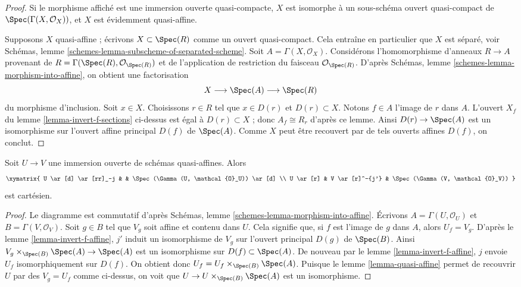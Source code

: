 \begin{proof}
Si le morphisme affiché est une immersion ouverte quasi-compacte,
$X$ est isomorphe à un sous-schéma ouvert quasi-compact de
$\Spec(\Gamma(X, \mathcal{O}_X))$, et $X$ est évidemment quasi-affine.

\medskip\noindent
Supposons $X$ quasi-affine ; écrivons $X \subset \Spec(R)$ comme un
ouvert quasi-compact. Cela entraîne en particulier que $X$ est
séparé, voir
Schémas, lemme \ref{schemes-lemma-subscheme-of-separated-scheme}.
Soit $A = \Gamma(X, \mathcal{O}_X)$.
Considérons l'homomorphisme d'anneaux $R \to A$ provenant de
$R = \Gamma(\Spec(R), \mathcal{O}_{\Spec(R)})$
et de l'application de restriction du faisceau $\mathcal{O}_{\Spec(R)}$.
D'après Schémas, lemme \ref{schemes-lemma-morphism-into-affine},
on obtient une factorisation
$$
X \longrightarrow
\Spec(A) \longrightarrow
\Spec(R)
$$
du morphisme d'inclusion. Soit $x \in X$. Choisissons $r \in R$ tel que
$x \in D(r)$ et $D(r) \subset X$. Notons $f \in A$ l'image de $r$
dans $A$. L'ouvert $X_f$ du lemme \ref{lemma-invert-f-sections}
ci-dessus est égal à $D(r) \subset X$ ; donc $A_f \cong R_r$ d'après
ce lemme.
Ainsi $D(r) \to \Spec(A)$ est un isomorphisme sur
l'ouvert affine principal $D(f)$ de $\Spec(A)$. Comme $X$
peut être recouvert par de tels ouverts affines $D(f)$, on conclut.
\end{proof}

\begin{lemma}
\label{lemma-cartesian-diagram-quasi-affine}
Soit $U \to V$ une immersion ouverte de schémas quasi-affines. Alors
$$
\xymatrix{
U \ar[d] \ar[rr]_-j & & \Spec(\Gamma(U, \mathcal{O}_U)) \ar[d] \\
U \ar[r] & V \ar[r]^-{j'} & \Spec(\Gamma(V, \mathcal{O}_V))
}
$$
est cartésien.
\end{lemma}

\begin{proof}
Le diagramme est commutatif d'après Schémas, lemme
\ref{schemes-lemma-morphism-into-affine}.
Écrivons $A = \Gamma(U, \mathcal{O}_U)$ et $B = \Gamma(V, \mathcal{O}_V)$. Soit
$g \in B$ tel que $V_g$ soit affine et contenu dans $U$. Cela
signifie que, si $f$ est l'image de $g$ dans $A$, alors $U_f = V_g$. D'après le lemme
\ref{lemma-invert-f-affine}, $j'$ induit un isomorphisme de
$V_g$ sur l'ouvert principal $D(g)$ de $\Spec(B)$. Ainsi
$V_g \times_{\Spec(B)} \Spec(A) \to \Spec(A)$ est un
isomorphisme sur $D(f) \subset \Spec(A)$. De nouveau par le lemme \ref{lemma-invert-f-affine},
$j$ envoie $U_f$ isomorphiquement sur $D(f)$. On obtient donc
$U_f = U_f \times_{\Spec(B)} \Spec(A)$. Puisque le
lemme \ref{lemma-quasi-affine} permet de recouvrir $U$ par des $V_g = U_f$ comme ci-dessus,
on voit que $U \to U \times_{\Spec(B)} \Spec(A)$ est un isomorphisme.
\end{proof}

